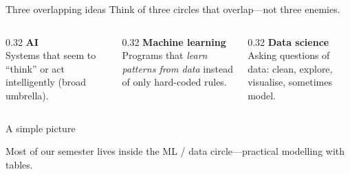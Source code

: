 \documentclass[aspectratio=169,11pt]{beamer}
\begin{document}
    \begin{frame}{Three overlapping ideas}
        Think of three circles that overlap---not three enemies.
        \vspace{0.8em}
        \begin{columns}[T]
            \begin{column}{0.32\textwidth}
                \textbf{AI}\\[0.3em]
                {\small Systems that seem to ``think'' or act intelligently (broad umbrella).}
            \end{column}
            \begin{column}{0.32\textwidth}
                \textbf{Machine learning}\\[0.3em]
                {\small Programs that \emph{learn patterns from data} instead of only hard-coded rules.}
            \end{column}
            \begin{column}{0.32\textwidth}
                \textbf{Data science}\\[0.3em]
                {\small Asking questions of data: clean, explore, visualise, sometimes model.}
            \end{column}
        \end{columns}
    \end{frame}

    \begin{frame}{A simple picture}
        \begin{center}
        \end{center}
        \vspace{0.3em}
        {\small Most of our semester lives inside the ML / data circle---practical modelling with tables.}
    \end{frame}
\end{document}

